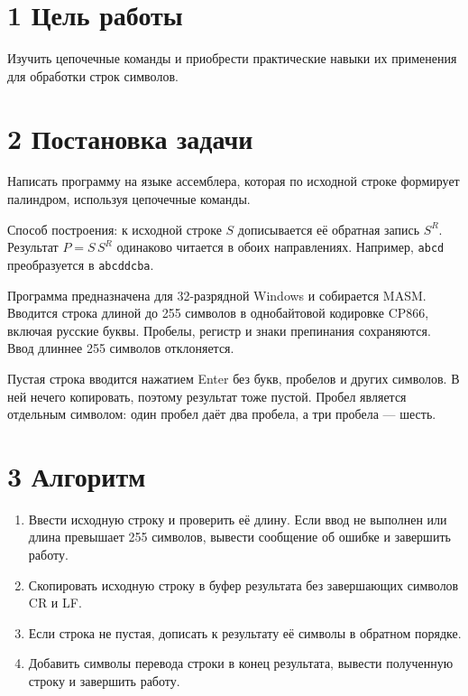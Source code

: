 \documentclass[12pt,a4paper]{article}
\begin{document}
\section*{1 Цель работы}
Изучить цепочечные команды и приобрести практические навыки их применения
для обработки строк символов.

\section*{2 Постановка задачи}
Написать программу на языке ассемблера, которая по исходной строке
формирует палиндром, используя цепочечные команды.

Способ построения: к исходной строке $S$ дописывается её обратная запись
$S^R$. Результат $P=S\,S^R$ одинаково читается в обоих направлениях.
Например, \texttt{abcd} преобразуется в \texttt{abcddcba}.

Программа предназначена для 32-разрядной Windows и собирается MASM.
Вводится строка длиной до 255 символов в однобайтовой кодировке CP866,
включая русские буквы. Пробелы, регистр и знаки препинания сохраняются.
Ввод длиннее 255 символов отклоняется.

Пустая строка вводится нажатием Enter без букв, пробелов и других символов.
В ней нечего копировать, поэтому результат тоже пустой.
Пробел является отдельным символом: один пробел даёт два пробела,
а три пробела --- шесть.

\section*{3 Алгоритм}
\begin{enumerate}
\item Ввести исходную строку и проверить её длину. Если ввод не выполнен
или длина превышает 255 символов, вывести сообщение об ошибке и завершить работу.
\item Скопировать исходную строку в буфер результата без завершающих
символов CR и LF.
\item Если строка не пустая, дописать к результату её символы в обратном порядке.
\item Добавить символы перевода строки в конец результата, вывести полученную
строку и завершить работу.
\end{enumerate}

\newpage
\end{document}
